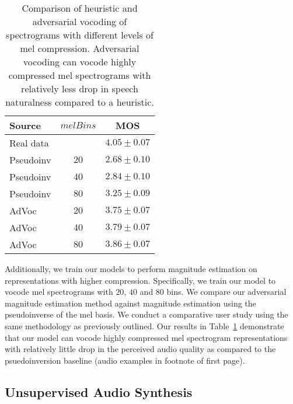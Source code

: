 \documentclass[a4paper]{article}
\begin{document}
\begin{table}[t]
\centering
\caption{Comparison of heuristic and adversarial vocoding of spectrograms with different levels of mel compression. Adversarial vocoding can vocode highly compressed mel spectrograms with relatively less drop in speech naturalness compared to a heuristic.}
\footnotesize
\begin{tabular}{lcc}
\toprule
Source & $melBins$ & MOS \\
\midrule
Real data & & $4.05 \pm 0.07$ \\
Pseudoinv & $20$ & $2.68 \pm 0.10$ \\
Pseudoinv & $40$ & $2.84 \pm 0.10$ \\
Pseudoinv & $80$ & $3.25 \pm 0.09$ \\
AdVoc & $20$ & $3.75 \pm 0.07$ \\
AdVoc & $40$ & $3.79 \pm 0.07$ \\
AdVoc & $80$ & $3.86 \pm 0.07$ \\
\bottomrule
\end{tabular}
\label{tab:compression}
\end{table}

Additionally, we train our models to perform magnitude estimation on representations with higher compression. 
Specifically, we train our model to vocode mel spectrograms with $20$, $40$ and $80$ bins. 
We compare our adversarial magnitude estimation method against magnitude estimation using the pseudoinverse of the mel basis. 
We conduct a comparative user study using the same methodology as previously outlined. 
Our results in 
Table~\ref{tab:compression} demonstrate that our model can vocode highly compressed mel spectrogram representations with relatively little drop in the perceived audio quality as compared to the psuedoinversion baseline (audio examples in footnote of first page).



\subsection{Unsupervised Audio Synthesis}
\end{document}
